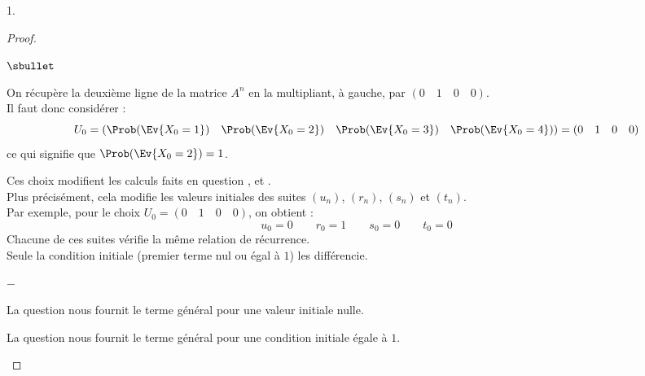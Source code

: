 \begin{noliste}{1.}
  \begin{proof}~%
    \begin{noliste}{$\sbullet$}
    \item On récupère la deuxième ligne de la matrice $A^n$ en la
      multipliant, à gauche, par $(0 \quad 1 \quad 0 \quad 0)$.\\
      Il faut donc considérer : 
      \[
      U_0 = (\Prob(\Ev{X_0 = 1}) \quad \Prob(\Ev{X_0 = 2}) \quad
      \Prob(\Ev{X_0 = 3}) \quad \Prob(\Ev{X_0 = 4})) = (0 \quad 1
      \quad 0 \quad 0)
      \]
      ce qui signifie que $\Prob(\Ev{X_0 = 2}) = 1$.%
    \item Ces choix modifient les calculs faits en question
      ,  et .\\
      Plus précisément, cela modifie les valeurs initiales des suites
      $(u_n)$, $(r_n)$, $(s_n)$ et $(t_n)$.\\
      Par exemple, pour le choix $U_0 = (0 \quad 1 \quad 0 \quad 0)$,
      on obtient :
      \[
      u_0 = 0 \qquad r_0 = 1 \qquad s_0 = 0 \qquad t_0 = 0
      \]
      Chacune de ces suites vérifie la même relation de
      récurrence.\\
      Seule la condition initiale (premier terme nul ou égal à $1$)
      les différencie.
      \begin{noliste}{$-$}
      \item La question  nous fournit le terme général pour
        une valeur initiale nulle.
      \item La question  nous fournit le terme général pour
        une condition initiale égale à $1$.
      \end{noliste}
\end{noliste}
\end{proof}
\end{noliste}
